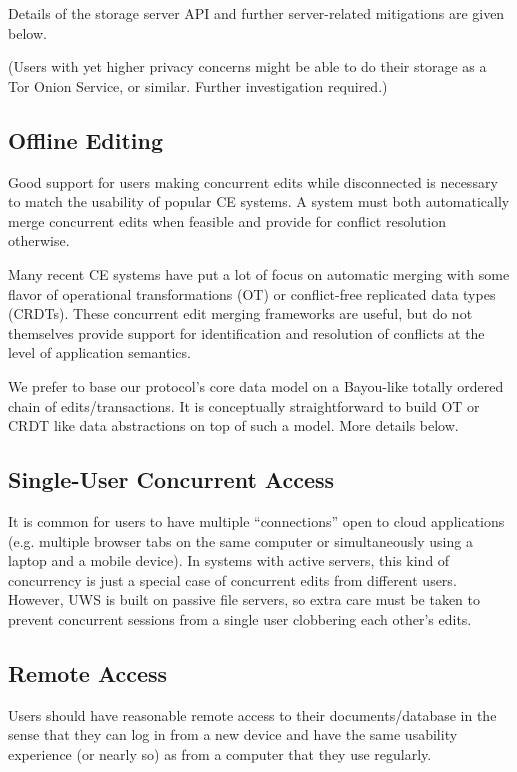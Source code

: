 \documentclass{article}
\begin{document}
Details of the storage server API and further server-related mitigations are given below.

(Users with yet higher privacy concerns might be able to do their storage as a Tor Onion Service, or similar.
Further investigation required.)

\subsection{Offline Editing}

Good support for users making concurrent edits while disconnected is necessary to match the usability of popular CE systems.
A system must both automatically merge concurrent edits when feasible and provide for conflict resolution otherwise.

Many recent CE systems have put a lot of focus on automatic merging with some flavor of operational transformations (OT) or conflict-free replicated data types (CRDTs).
These concurrent edit merging frameworks are useful, but do not themselves provide support for identification and resolution of conflicts at the level of application semantics.

We prefer to base our protocol's core data model on a Bayou-like totally ordered chain of edits/transactions.
It is conceptually straightforward to build OT or CRDT like data abstractions on top of such a model.
More details below.

\subsection{Single-User Concurrent Access}

It is common for users to have multiple ``connections'' open to cloud applications (e.g. multiple browser tabs on the same computer or simultaneously using a laptop and a mobile device).
In systems with active servers, this kind of concurrency is just a special case of concurrent edits from different users.
However, UWS is built on passive file servers, so extra care must be taken to prevent concurrent sessions from a single user clobbering each other's edits.

\subsection{Remote Access}

Users should have reasonable remote access to their documents/database in the sense that they can log in from a new device and have the same usability experience (or nearly so) as from a computer that they use regularly.
\end{document}
